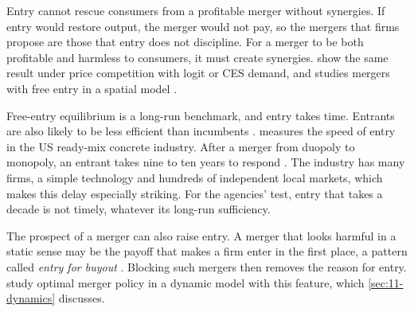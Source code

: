 Entry cannot rescue consumers from a profitable merger without synergies. If entry would restore output, the merger
would not pay, so the mergers that firms propose are those that entry does not discipline. For a merger to be both
profitable and harmless to consumers, it must create synergies. \citet{CaradonnaMillerSheu2021} show the same
result under price competition with logit or CES demand, and \citet{Cabral2003} studies mergers with free entry in a
spatial model \citep[n.~140]{AskerNocke2021}.

Free-entry equilibrium is a long-run benchmark, and entry takes time. Entrants are also likely to be less efficient
than incumbents \citep[p.~232]{AskerNocke2021}. \citet{CollardWexler2014} measures the speed of entry in the US
ready-mix concrete industry. After a merger from duopoly to monopoly, an entrant takes nine to ten years to respond
\citep[p.~222]{AskerNocke2021}. The industry has many firms, a simple technology and hundreds of independent local
markets, which makes this delay especially striking. For the agencies' test, entry that takes a decade is not
timely, whatever its long-run sufficiency.

The prospect of a merger can also raise entry. A merger that looks harmful in a static sense may be the payoff that
makes a firm enter in the first place, a pattern called \emph{entry for buyout} \citep{Rasmusen1988}. Blocking such
mergers then removes the reason for entry. \citet{MermelsteinEtAl2020} study optimal merger policy in a dynamic model
with this feature, which \cref{sec:11-dynamics} discusses.
